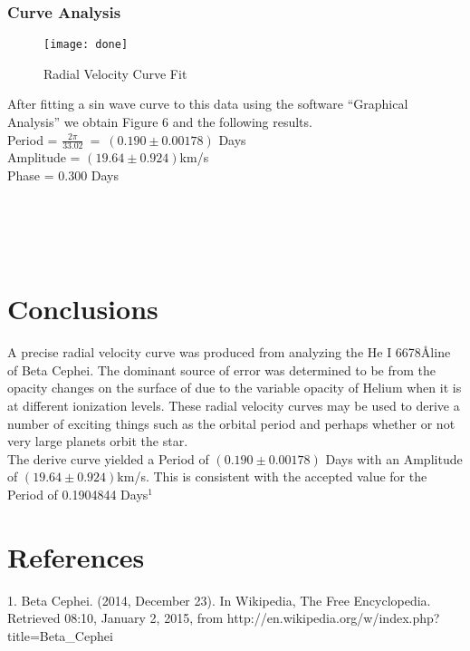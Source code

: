 \documentclass{article}
\begin{document}
\subsubsection{Curve Analysis}
\begin{figure}
\texttt{[image: done]} %
\caption{Radial Velocity Curve Fit}
\end{figure}
After fitting a sin wave curve to this data using the software ``Graphical Analysis'' we obtain Figure 6 and the following results.\\

Period = $\frac{2\pi}{33.02}\ =\ (0.190\pm0.00178)$ Days\\
Amplitude = $(19.64\pm0.924)$km/s\\
Phase = 0.300 Days\\\\\\\\\\
\section{Conclusions}
A precise radial velocity curve was produced from analyzing the He I 6678\AA line of Beta Cephei. The dominant source of error was determined to be from the opacity changes on the surface of due to the variable opacity of Helium when it is at different ionization levels. These radial velocity curves may be used to derive a number of exciting things such as the orbital period and perhaps whether or not very large planets orbit the star.\\

The derive curve yielded a Period of $(0.190\pm0.00178)$ Days with an Amplitude of $(19.64\pm0.924)$km/s. This is consistent with the accepted value for the Period of 0.1904844 Days$^1$
\section{References}
1. Beta Cephei. (2014, December 23). In Wikipedia, The Free Encyclopedia. Retrieved 08:10, January 2, 2015, from http://en.wikipedia.org/w/index.php?title=Beta\_Cephei
\end{document}
